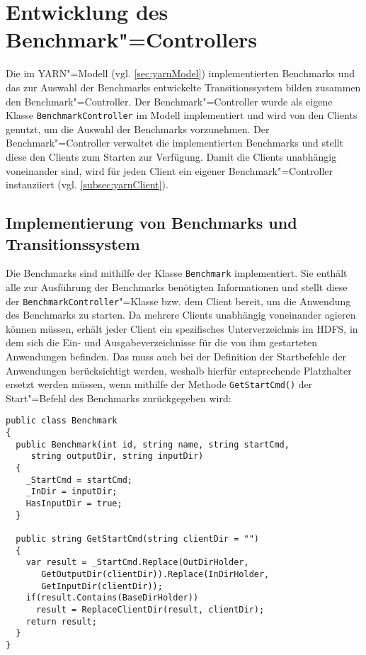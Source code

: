 \section{Entwicklung des Benchmark"=Controllers}
\label{sec:benchmarkController}

Die im YARN"=Modell (vgl. \cref{sec:yarnModel}) implementierten Benchmarks und das zur Auswahl der Benchmarks entwickelte Transitionssystem bilden zusammen den Benchmark"=Controller.
Der Benchmark"=Controller wurde als eigene Klasse \texttt{BenchmarkController} im Modell implementiert und wird von den Clients genutzt, um die Auswahl der Benchmarks vorzunehmen.
Der Benchmark"=Controller verwaltet die implementierten Benchmarks und stellt diese den Clients zum Starten zur Verfügung.
Damit die Clients unabhängig voneinander sind, wird für jeden Client ein eigener Benchmark"=Controller instanziiert (vgl. \cref{subsec:yarnClient}).

\subsection{Implementierung von Benchmarks und Transitionssystem}
\label{subsec:appImplementation}

Die Benchmarks sind mithilfe der Klasse \texttt{Benchmark} implementiert.
Sie enthält alle zur Ausführung der Benchmarks benötigten Informationen und stellt diese der \texttt{BenchmarkController}"=Klasse bzw. dem Client bereit, um die Anwendung des Benchmarks zu starten.
Da mehrere Clients unabhängig voneinander agieren können müssen, erhält jeder Client ein spezifisches Unterverzeichnis im HDFS, in dem sich die Ein- und Ausgabeverzeichnisse für die von ihm gestarteten Anwendungen befinden.
Das muss auch bei der Definition der Startbefehle der Anwendungen berücksichtigt werden, weshalb hierfür entsprechende Platzhalter ersetzt werden müssen, wenn mithilfe der Methode \texttt{GetStartCmd()} der Start"=Befehl des Benchmarks zurückgegeben wird:

\begin{lstlisting}[label=lst:benchmarkClass,style=cs,
caption={[Wesentliche Methoden der Klasse Benchmark]
    Wesentliche Methoden der Klasse \texttt{Benchmark}}]
public class Benchmark
{
  public Benchmark(int id, string name, string startCmd,
     string outputDir, string inputDir)
  {
    _StartCmd = startCmd;
    _InDir = inputDir;
    HasInputDir = true;
  }
  
  public string GetStartCmd(string clientDir = "")
  {
    var result = _StartCmd.Replace(OutDirHolder,
       GetOutputDir(clientDir)).Replace(InDirHolder,
       GetInputDir(clientDir));
    if(result.Contains(BaseDirHolder))
      result = ReplaceClientDir(result, clientDir);
    return result;
  }
}
\end{lstlisting}

